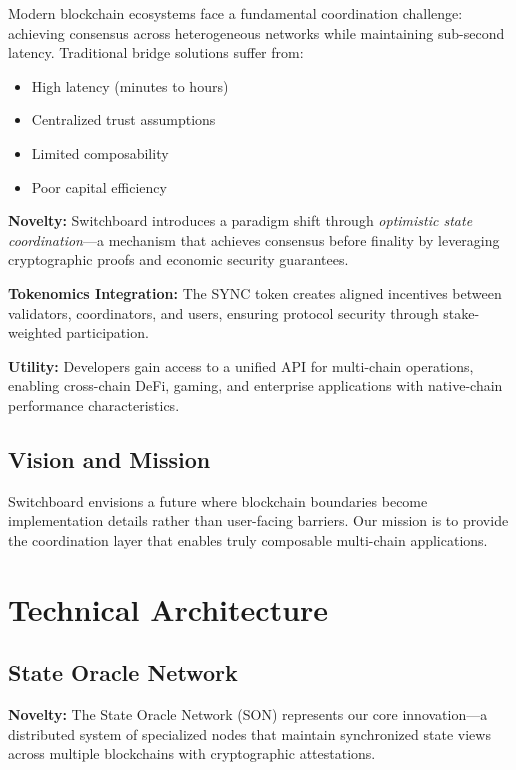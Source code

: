 \documentclass[12pt,a4paper]{article}
\begin{document}
Modern blockchain ecosystems face a fundamental coordination challenge: achieving consensus across heterogeneous networks while maintaining sub-second latency. Traditional bridge solutions suffer from:

\begin{itemize}
    \item High latency (minutes to hours)
    \item Centralized trust assumptions
    \item Limited composability
    \item Poor capital efficiency
\end{itemize}

\textbf{Novelty:} Switchboard introduces a paradigm shift through \textit{optimistic state coordination}---a mechanism that achieves consensus before finality by leveraging cryptographic proofs and economic security guarantees.

\textbf{Tokenomics Integration:} The SYNC token creates aligned incentives between validators, coordinators, and users, ensuring protocol security through stake-weighted participation.

\textbf{Utility:} Developers gain access to a unified API for multi-chain operations, enabling cross-chain DeFi, gaming, and enterprise applications with native-chain performance characteristics.

\subsection{Vision and Mission}

Switchboard envisions a future where blockchain boundaries become implementation details rather than user-facing barriers. Our mission is to provide the coordination layer that enables truly composable multi-chain applications.

\section{Technical Architecture}

\subsection{State Oracle Network}

\textbf{Novelty:} The State Oracle Network (SON) represents our core innovation---a distributed system of specialized nodes that maintain synchronized state views across multiple blockchains with cryptographic attestations.
\end{document}
